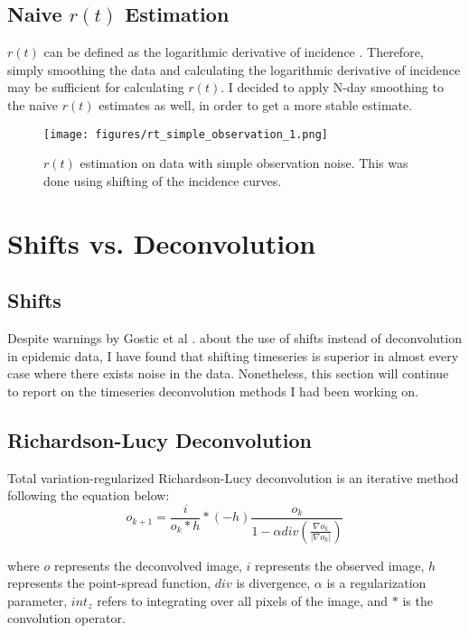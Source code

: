 \documentclass{article}
\begin{document}
\subsection{Naive $r(t)$ Estimation}
$r(t)$ can be defined as the logarithmic derivative of incidence \cite{Gostic}. Therefore, simply smoothing the data and calculating the logarithmic derivative of incidence may be sufficient for calculating $r(t)$. I decided to apply N-day smoothing to the naive $r(t)$ estimates as well, in order to get a more stable estimate.


\begin{figure}[h!]
    \centering
    \texttt{[image: figures/rt\_simple\_observation\_1.png]}
    \caption{$r(t)$ estimation on data with simple observation noise. This was done using shifting of the incidence curves.}
\end{figure}


\section{Shifts vs. Deconvolution}

\subsection{Shifts}
Despite warnings by Gostic et al \cite{Gostic}. about the use of shifts instead of deconvolution in epidemic data, I have found that shifting timeseries is superior in almost every case where there exists noise in the data. Nonetheless, this section will continue to report on the timeseries deconvolution methods I had been working on.


\subsection{Richardson-Lucy Deconvolution}
Total variation-regularized Richardson-Lucy deconvolution is an iterative method following the equation below: \cite{RLLoss}
\begin{equation}
    o_{k+1} = \frac{i}{o_k * h} * (-h) \frac{o_k}{1-\alpha div(\frac{\nabla o_k}{|\nabla o_k|})}
\end{equation}

where $o$ represents the deconvolved image, $i$ represents the observed image, $h$ represents the point-spread function, $div$ is divergence, $\alpha$ is a regularization parameter, $int_z$ refers to integrating over all pixels of the image, and $*$ is the convolution operator.
\end{document}

